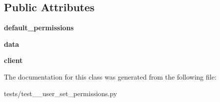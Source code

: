 \subsection*{Public Attributes}
\begin{DoxyCompactItemize}
\item 
\mbox{\label{classtests_1_1test__10__user__set__permissions_1_1_test_user_routes_a92fa08fe3cac79bfe98eb13ceefcebc7}} 
{\bfseries default\+\_\+permissions}
\item 
\mbox{\label{classtests_1_1test__10__user__set__permissions_1_1_test_user_routes_a34082aa26856646968b841607e83f15e}} 
{\bfseries data}
\item 
\mbox{\label{classtests_1_1test__10__user__set__permissions_1_1_test_user_routes_ae56d56b77420d199248164a5586655bf}} 
{\bfseries client}
\end{DoxyCompactItemize}


The documentation for this class was generated from the following file\+:\begin{DoxyCompactItemize}
\item 
tests/test\+\_\+\_\+user\+\_\+set\+\_\+permissions.\+py\end{DoxyCompactItemize}
